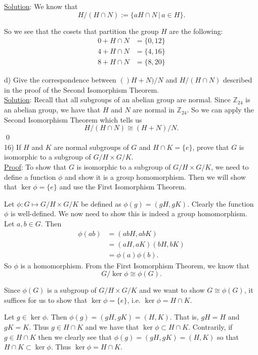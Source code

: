 \documentclass{article}
\begin{document}
\underline{Solution}: We know that
$$ H / (H \cap N) := \{ aH \cap N \, \vert \, a \in H \}.$$

So we see that the cosets that partition the group $H$ are the following:
\begin{align*}
	0 + H \cap N &= \{0, 12\} \\
	4 + H \cap N &= \{4, 16\}  \\
	8 + H \cap N &= \{8, 20\}
\end{align*}

d) Give the correspondence between $()H+N)/N$ and $H/(H \cap N)$ described in the proof of the Second Isomorphism Theorem. \\

\underline{Solution}: Recall that all subgroups of an abelian group are normal. Since $\mathbb{Z}_{24}$ is an abelian group, we have that $H$ and $N$ are normal in $\mathbb{Z}_{24}$. So we can apply the Second Isomorphism Theorem which tells us
$$H / (H \cap N) \cong (H+N) / N.$$ \qed \\

16) If $H$ and $K$ are normal subgroups of $G$ and $H \cap K = \{ {e} \}$, prove that $G$ is isomorphic to a subgroup of $G/H \times G/K$. \\

\underline{Proof}: To show that $G$ is isomorphic to a subgroup of $G/H \times G/K$, we need to define a function $\phi$ and show it is a group homomorphism. Then we will show that $\ker \phi = \{e\}$ and use the First Isomorphism Theorem.

Let $\phi : G \mapsto G/H \times G/K$ be defined as $\phi(g) = (gH, gK)$. Clearly the function $\phi$ is well-defined. We now need to show this is indeed a group homomorphism. Let $a, b \in G$. Then
\begin{align*}
	\phi(ab) &= (abH, abK) \\
	&= (aH, aK)(bH, bK) \\
	&= \phi(a)\phi(b).
\end{align*} So $\phi$ is a homomorphism. From the First Isomorphism Theorem, we know that 
$$G / \ker \phi \cong \phi(G).$$

Since $\phi(G)$ is a subgroup of $G/H \times G/K$ and we want to show $G \cong \phi(G)$, it suffices for us to show that $\ker \phi = \{ e \}$, i.e. $\ker \phi = H \cap K$. 

Let $g \in \ker \phi$. Then $\phi(g) = (gH, gK) = (H, K)$. That is, $gH = H$ and $gK = K$. Thus $g \in H \cap K$ and we have that $\ker \phi \subset H \cap K$. Contrarily, if $g \in H \cap K$ then we clearly see that $\phi(g) = (gH, gK) = (H, K)$ so that $H \cap K \subset \ker \phi$. Thus $\ker \phi = H \cap K$.
\end{document}
